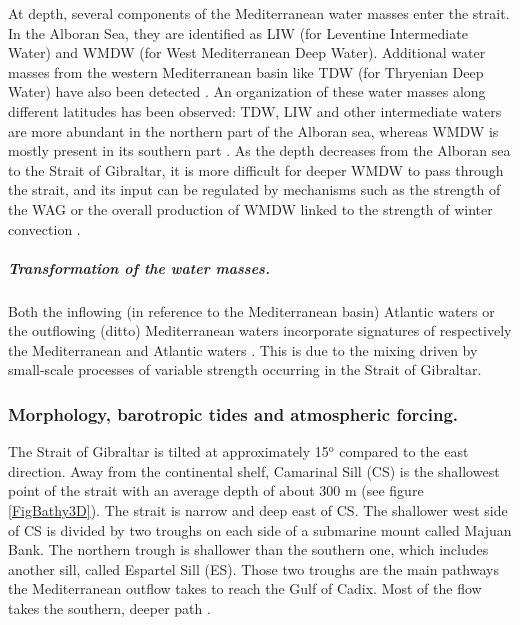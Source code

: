 At depth, several components of the Mediterranean water masses enter the strait. In the Alboran Sea, they are identified as LIW (for Leventine Intermediate Water) and WMDW (for West Mediterranean Deep Water).  Additional water masses from the western Mediterranean basin like TDW (for Thryenian Deep Water) have also been detected \citep{millot_2014}. An organization of these water masses along different latitudes has been observed: TDW, LIW and other intermediate waters are more abundant in the northern part of the Alboran sea, whereas WMDW is mostly present in its southern part \citep{millot_2014}. As the depth decreases from the Alboran sea to the Strait of Gibraltar, it is more difficult for deeper WMDW to pass through the strait, and its input can be regulated by mechanisms such as the strength of the WAG or the overall production of WMDW linked to the strength of winter convection \citep{naranjo_2012}.

\subparagraph{Transformation of the water masses.}
Both the inflowing (in reference to the Mediterranean basin) Atlantic waters or the outflowing (ditto) Mediterranean waters incorporate signatures of respectively the Mediterranean \citep{macias_2006} and Atlantic waters \citep{millot_2007,garcia-lafuente_2011}. This is due to the mixing driven by small-scale processes of variable strength occurring in the Strait of Gibraltar.  


\subsubsection{Morphology, barotropic tides and atmospheric forcing.} 


The Strait of Gibraltar is tilted at approximately 15$^\text{o}$ compared to the east direction. Away from the continental shelf, Camarinal Sill (CS) is the shallowest point of the strait with an average depth of about 300 m (see figure \ref{FigBathy3D}). The strait is narrow and deep east of CS. The shallower west side of CS is divided by two troughs on each side of a submarine mount called Majuan Bank. The northern trough is shallower than the southern one, which includes another sill, called Espartel Sill (ES). Those two troughs are the main pathways the Mediterranean outflow takes to reach the Gulf of Cadix. Most of the flow takes the southern, deeper path \citep{soto-navarro_2015}.

